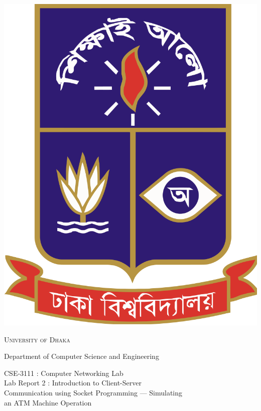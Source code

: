 \documentclass[11pt]{article}
\begin{document}
\begin{titlepage}
    \begin{center}
        \includegraphics[scale=0.10]{du.png}\par
        \begin{Huge}
            \textsc{University of Dhaka}\par
        \end{Huge}
        \begin{Large}
            Department of Computer Science and Engineering\par \vspace{1cm}
            CSE-3111 : Computer Networking Lab \\[12pt]   
            Lab Report 2 : Introduction to Client-Server \\[5pt]Communication using Socket Programming — Simulating \\[5pt]an ATM Machine Operation
        \end{Large}
    \end{center}     

\end{titlepage}
\end{document}
